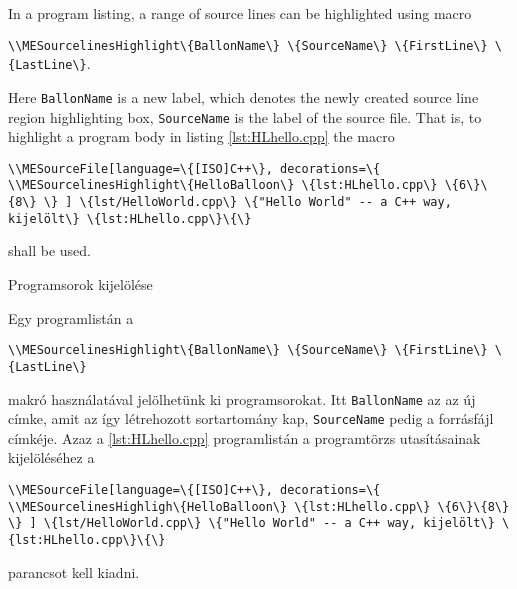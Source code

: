 {
In a program listing, a range of source lines can be highlighted using macro 
\par\noindent\lstinline|\\MESourcelinesHighlight\{BallonName\} \{SourceName\} \{FirstLine\} \{LastLine\}|.
\par\noindent Here  \lstinline|BallonName| is a new label, which denotes the 
newly created source line region highlighting box, \lstinline|SourceName| 
is the label of the source file. That is, to highlight a program body in listing
 \ref{lst:HLhello.cpp} the macro

\par\noindent\lstinline|\\MESourceFile[language=\{[ISO]C++\},
decorations=\{
\\MESourcelinesHighlight\{HelloBalloon\} \{lst:HLhello.cpp\} \{6\}\{8\}
\}
] \{lst/HelloWorld.cpp\} \{"Hello World" -- a C++ way, kijelölt\} \{lst:HLhello.cpp\}\{\}|

\par\noindent shall be used.

}
{Programsorok kijelölése}
{
Egy programlistán a
\par\noindent\lstinline|\\MESourcelinesHighlight\{BallonName\} \{SourceName\} \{FirstLine\} \{LastLine\}|
\par\noindent makró használatával jelölhetünk ki programsorokat. Itt \lstinline|BallonName|
az az új címke, amit az így létrehozott sortartomány kap, \lstinline|SourceName| pedig a
forrásfájl címkéje. Azaz a \ref{lst:HLhello.cpp} programlistán a programtörzs utasításainak
kijelöléséhez a


\par\noindent\lstinline|\\MESourceFile[language=\{[ISO]C++\},
decorations=\{
\\MESourcelinesHighligh\{HelloBalloon\} \{lst:HLhello.cpp\} \{6\}\{8\}
\}
] \{lst/HelloWorld.cpp\} \{"Hello World" -- a C++ way, kijelölt\} \{lst:HLhello.cpp\}\{\}|

\par\noindent parancsot kell kiadni.

}

